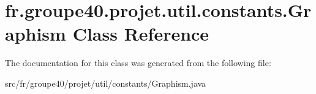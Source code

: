 \hypertarget{classfr_1_1groupe40_1_1projet_1_1util_1_1constants_1_1_graphism}{}\section{fr.\+groupe40.\+projet.\+util.\+constants.\+Graphism Class Reference}
\label{classfr_1_1groupe40_1_1projet_1_1util_1_1constants_1_1_graphism}


The documentation for this class was generated from the following file\+:\begin{DoxyCompactItemize}
\item 
src/fr/groupe40/projet/util/constants/Graphism.\+java\end{DoxyCompactItemize}
